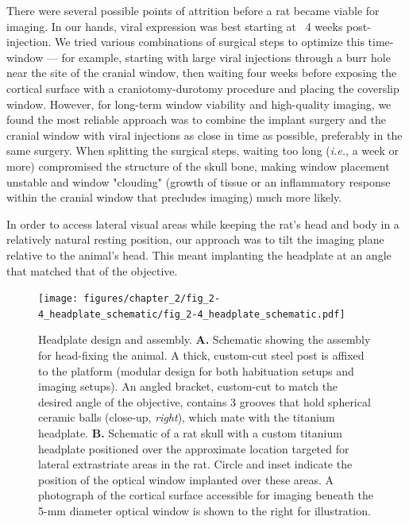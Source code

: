 There were several possible points of attrition before a rat became viable for imaging. In our hands, viral expression was best starting at ~4 weeks post-injection. We tried various combinations of surgical steps to optimize this time-window --- for example, starting with large viral injections through a burr hole near the site of the cranial window, then waiting four weeks before exposing the cortical surface with a craniotomy-durotomy procedure and placing the coverslip window. However, for long-term window viability and high-quality imaging, we found the most reliable approach was to combine the implant surgery and the cranial window with viral injections as close in time as possible, preferably in the same surgery. When splitting the surgical steps, waiting too long (\textit{i.e.}, a week or more) compromised the structure of the skull bone, making window placement unstable and window "clouding" (growth of tissue or an inflammatory response within the cranial window that precludes imaging) much more likely. 

In order to access lateral visual areas while keeping the rat’s head and body in a relatively natural resting position, our approach was to tilt the imaging plane relative to the animal’s head. This meant implanting the headplate at an angle that matched that of the objective. 

\begin{figure}
    \texttt{[image: figures/chapter\_2/fig\_2-4\_headplate\_schematic/fig\_2-4\_headplate\_schematic.pdf]}
    \vspace{.1in}
    \caption[Headplate design and assembly]{Headplate design and assembly. \textbf{A.} Schematic showing the assembly for head-fixing the animal. A thick, custom-cut steel post is affixed to the platform (modular design for both habituation setups and imaging setups). An angled bracket, custom-cut to match the desired angle of the objective, contains 3 grooves that hold spherical ceramic balls (close-up, \textit{right}), which mate with the titanium headplate. \textbf{B.} Schematic of a rat skull with a custom titanium headplate positioned over the approximate location targeted for lateral extrastriate areas in the rat. Circle and inset indicate the position of the optical window implanted over these areas. A photograph of the cortical surface accessible for imaging beneath the 5-mm diameter optical window is shown to the right for illustration. 
    \label{fig:headplate_schematic}}
\end{figure}

